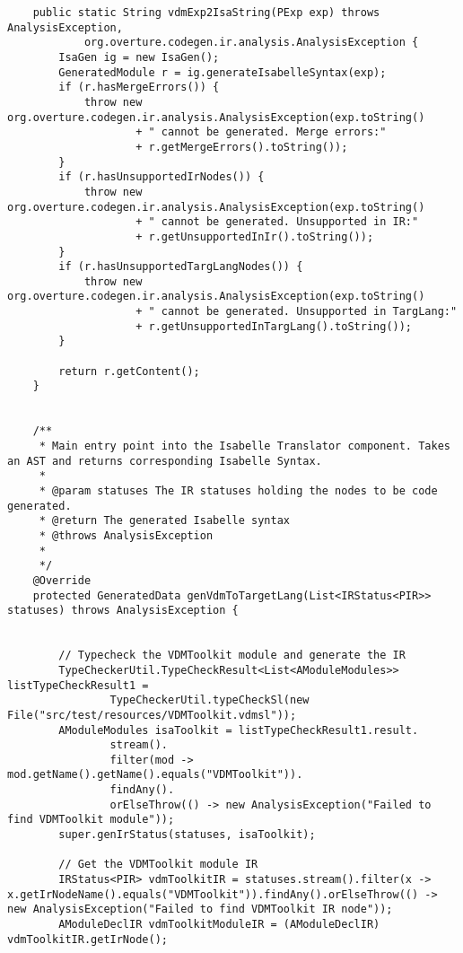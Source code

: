 \begin{appendices}
\begin{lstlisting}
    public static String vdmExp2IsaString(PExp exp) throws AnalysisException,
            org.overture.codegen.ir.analysis.AnalysisException {
        IsaGen ig = new IsaGen();
        GeneratedModule r = ig.generateIsabelleSyntax(exp);
        if (r.hasMergeErrors()) {
            throw new org.overture.codegen.ir.analysis.AnalysisException(exp.toString()
                    + " cannot be generated. Merge errors:"
                    + r.getMergeErrors().toString());
        }
        if (r.hasUnsupportedIrNodes()) {
            throw new org.overture.codegen.ir.analysis.AnalysisException(exp.toString()
                    + " cannot be generated. Unsupported in IR:"
                    + r.getUnsupportedInIr().toString());
        }
        if (r.hasUnsupportedTargLangNodes()) {
            throw new org.overture.codegen.ir.analysis.AnalysisException(exp.toString()
                    + " cannot be generated. Unsupported in TargLang:"
                    + r.getUnsupportedInTargLang().toString());
        }

        return r.getContent();
    }


    /**
     * Main entry point into the Isabelle Translator component. Takes an AST and returns corresponding Isabelle Syntax.
     *
     * @param statuses The IR statuses holding the nodes to be code generated.
     * @return The generated Isabelle syntax
     * @throws AnalysisException
     *
     */
    @Override
    protected GeneratedData genVdmToTargetLang(List<IRStatus<PIR>> statuses) throws AnalysisException {
      
      
        // Typecheck the VDMToolkit module and generate the IR
        TypeCheckerUtil.TypeCheckResult<List<AModuleModules>> listTypeCheckResult1 =
                TypeCheckerUtil.typeCheckSl(new File("src/test/resources/VDMToolkit.vdmsl"));
        AModuleModules isaToolkit = listTypeCheckResult1.result.
                stream().
                filter(mod -> mod.getName().getName().equals("VDMToolkit")).
                findAny().
                orElseThrow(() -> new AnalysisException("Failed to find VDMToolkit module"));
        super.genIrStatus(statuses, isaToolkit);

        // Get the VDMToolkit module IR
        IRStatus<PIR> vdmToolkitIR = statuses.stream().filter(x -> x.getIrNodeName().equals("VDMToolkit")).findAny().orElseThrow(() -> new AnalysisException("Failed to find VDMToolkit IR node"));
        AModuleDeclIR vdmToolkitModuleIR = (AModuleDeclIR) vdmToolkitIR.getIrNode();



\end{lstlisting}
\end{appendices}
